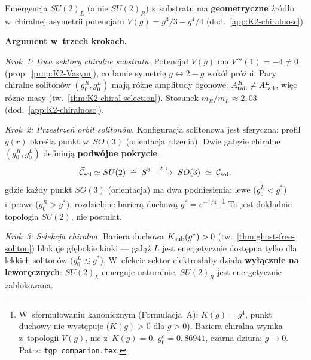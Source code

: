 \begin{proposition}%
\label{prop:su2-from-chirality}
Emergencja $SU(2)_L$ (a nie $SU(2)_R$) z~substratu ma
\textbf{geometryczne} \'zr\'od\l{}o w~chiralnej asymetrii
potencja\l{}u $V(g) = g^3/3 - g^4/4$ (dod.~\ref{app:K2-chiralnosc}).

\medskip\noindent\textbf{Argument w~trzech krokach.}

\emph{Krok~1: Dwa sektory chiralne substratu.}\;
Potencja\l{} $V(g)$ ma $V'''(1) = -4 \neq 0$ (prop.~\ref{prop:K2-Vasym}),
co \l{}amie symetri\k{e} $g \leftrightarrow 2-g$ wok\'o\l{} pr\'o\.zni.
Pary chiralne soliton\'ow $(g_0^R, g_0^L)$ maj\k{a} r\'o\.zne amplitudy
ogonowe: $A_{\rm tail}^R \neq A_{\rm tail}^L$, wi\k{e}c r\'o\.zne masy
(tw.~\ref{thm:K2-chiral-selection}). Stosunek $m_R/m_L \approx 2{,}03$
(dod.~\ref{app:K2-chiralnosc}).

\emph{Krok~2: Przestrze\'n orbit soliton\'ow.}\;
Konfiguracja solitonowa jest sferyczna: profil $g(r)$ okre\'sla punkt
w~$SO(3)$ (orientacja rdzenia). Dwie ga\l{}\k{e}zie chiralne
$(g_0^R, g_0^L)$ definiuj\k{a} \textbf{podw\'ojne pokrycie}:
\begin{equation}\label{eq:su2-cover}
    \widetilde{\mathcal{C}}_{\rm sol} \simeq SU(2) \;\cong\; S^3
    \;\xrightarrow{\;2:1\;}\; SO(3) \;\simeq\; \mathcal{C}_{\rm sol},
\end{equation}
gdzie ka\.zdy punkt $SO(3)$ (orientacja) ma dwa podniesienia:
lewe ($g_0^L < g^*$) i~prawe ($g_0^R > g^*$), rozdzielone
barier\k{a} duchow\k{a} $g^* = e^{-1/4}$.%
\footnote{W~sformu\l{}owaniu kanonicznym (Formulacja~A): $K(g) = g^4$,
punkt duchowy nie wyst\k{e}puje ($K(g) > 0$ dla $g > 0$).
Bariera chiralna wynika z~topologii $V(g)$, nie z~$K(g) = 0$.
$g_0^e = 0{,}86941$, czarna dziura: $g \to 0$.
Patrz: \texttt{tgp\_companion.tex}.}
To jest dok\l{}adnie topologia $SU(2)$, nie postulat.

\emph{Krok~3: Selekcja chiralna.}\;
Bariera duchowa $K_{\rm sub}(g^*) > 0$ (tw.~\ref{thm:ghost-free-soliton})
blokuje g\l{}\k{e}bokie kinki --- ga\l{}\k{a}\'z $L$ jest
energetycznie dost\k{e}pna tylko dla lekkich soliton\'ow
($g_0^L \lesssim g^*$). W~efekcie sektor elektros\l{}aby
dzia\l{}a \textbf{wy\l{}\k{a}cznie na lewor\k{e}cznych}:
$SU(2)_L$ emerguje naturalnie, $SU(2)_R$ jest energetycznie
zablokowana.
\end{proposition}

